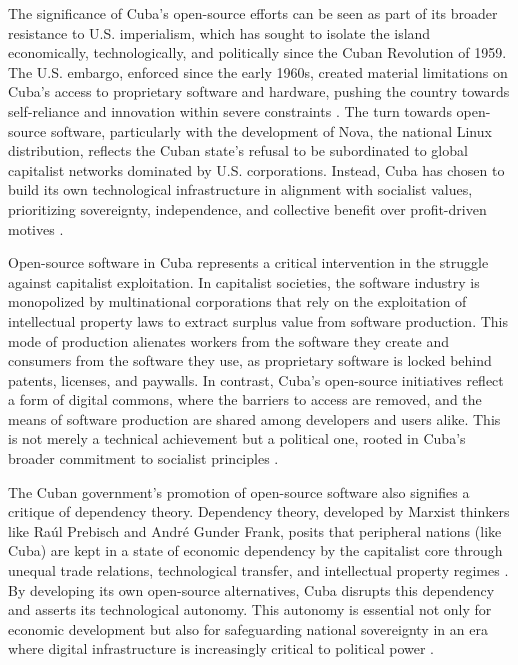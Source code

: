 \begin{refsection}
The significance of Cuba's open-source efforts can be seen as part of its broader resistance to U.S. imperialism, which has sought to isolate the island economically, technologically, and politically since the Cuban Revolution of 1959. The U.S. embargo, enforced since the early 1960s, created material limitations on Cuba's access to proprietary software and hardware, pushing the country towards self-reliance and innovation within severe constraints \cite[pp.~23-45]{prebisch}. The turn towards open-source software, particularly with the development of Nova, the national Linux distribution, reflects the Cuban state's refusal to be subordinated to global capitalist networks dominated by U.S. corporations. Instead, Cuba has chosen to build its own technological infrastructure in alignment with socialist values, prioritizing sovereignty, independence, and collective benefit over profit-driven motives \cite[pp.~90-112]{gunderfrank}.

Open-source software in Cuba represents a critical intervention in the struggle against capitalist exploitation. In capitalist societies, the software industry is monopolized by multinational corporations that rely on the exploitation of intellectual property laws to extract surplus value from software production. This mode of production alienates workers from the software they create and consumers from the software they use, as proprietary software is locked behind patents, licenses, and paywalls. In contrast, Cuba's open-source initiatives reflect a form of digital commons, where the barriers to access are removed, and the means of software production are shared among developers and users alike. This is not merely a technical achievement but a political one, rooted in Cuba's broader commitment to socialist principles \cite[pp.~90-112]{gunderfrank}.

The Cuban government's promotion of open-source software also signifies a critique of dependency theory. Dependency theory, developed by Marxist thinkers like Raúl Prebisch and André Gunder Frank, posits that peripheral nations (like Cuba) are kept in a state of economic dependency by the capitalist core through unequal trade relations, technological transfer, and intellectual property regimes \cite[pp.~23-45]{prebisch}. By developing its own open-source alternatives, Cuba disrupts this dependency and asserts its technological autonomy. This autonomy is essential not only for economic development but also for safeguarding national sovereignty in an era where digital infrastructure is increasingly critical to political power \cite[pp.~23-45]{prebisch}.


\end{refsection}

